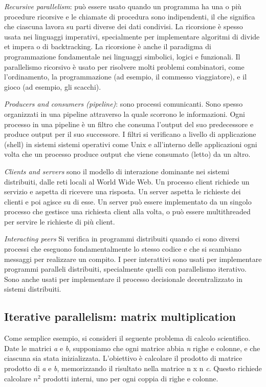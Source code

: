 \documentclass[10pt,a4paper]{article}
\begin{document}
\textit{Recursive parallelism}: può essere usato quando un programma ha una o più procedure ricorsive e le chiamate di procedura sono indipendenti, il che significa che ciascuna lavora su parti diverse dei dati condivisi. La ricorsione è spesso usata nei linguaggi imperativi, specialmente per implementare algoritmi di divide et impera o di backtracking. La ricorsione è anche il paradigma di programmazione fondamentale nei linguaggi simbolici, logici e funzionali. Il parallelismo ricorsivo è usato per risolvere molti problemi combinatori, come l'ordinamento, la programmazione (ad esempio, il commesso viaggiatore), e il gioco (ad esempio, gli scacchi).

\textit{Producers and consumers (pipeline)}: sono processi comunicanti. Sono spesso organizzati in una pipeline attraverso la quale scorrono le informazioni. Ogni processo in una pipeline è un filtro che consuma l'output del suo predecessore e produce output per il suo successore. I filtri si verificano a livello di applicazione (shell) in sistemi sistemi operativi come Unix e all'interno delle applicazioni ogni volta che un processo produce output che viene consumato (letto) da un altro.

\textit{Clients and servers} sono il modello di interazione dominante nei sistemi distribuiti, dalle reti locali al World Wide Web. Un processo client richiede un servizio e aspetta di ricevere una risposta. Un server aspetta le richieste dei clienti e poi agisce su di esse. Un server può essere implementato da un singolo processo che gestisce una richiesta client alla volta, o può essere multithreaded per servire le richieste di più client. 

\textit{Interacting peers} Si verifica in programmi distribuiti quando ci sono diversi processi che eseguono fondamentalmente lo stesso codice e che si scambiano messaggi per realizzare un compito. I peer interattivi sono usati per implementare programmi paralleli distribuiti, specialmente quelli con  parallelismo iterativo. Sono anche usati per implementare il processo decisionale decentralizzato in sistemi distribuiti.

\subsection{Iterative parallelism: matrix multiplication}
Come semplice esempio, si consideri il seguente problema di calcolo scientifico. Date le matrici \textit{a} e \textit{b}, supponiamo che ogni matrice abbia \textit{n} righe e colonne, e che ciascuna sia stata inizializzata. L'obiettivo è calcolare il prodotto di matrice prodotto di \textit{a} e \textit{b}, memorizzando il risultato nella matrice n x n \textit{c}. Questo richiede calcolare $ n^{2} $ prodotti interni, uno per ogni coppia di righe e colonne.
\end{document}
